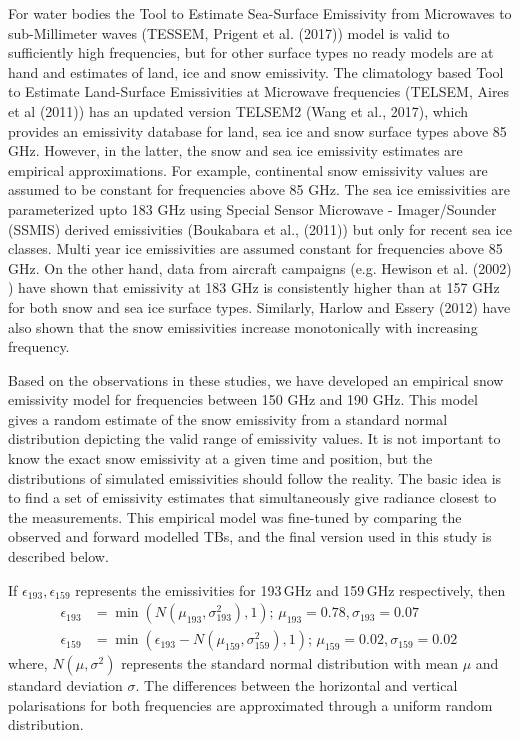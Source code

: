 \documentclass[amt, manuscript]{copernicus}
\begin{document}
For water bodies the Tool to Estimate Sea-Surface Emissivity from Microwaves to sub-Millimeter waves (TESSEM, Prigent et al. (2017)) model is valid to sufficiently high frequencies, but for other surface types no ready models are at hand and estimates of land, ice and snow emissivity. The climatology based Tool to Estimate Land-Surface Emissivities at Microwave frequencies (TELSEM, Aires et al (2011)) has an updated version TELSEM2 (Wang et al., 2017), which provides an emissivity database for land, sea ice and snow surface types above 85 GHz. However, in the latter,  the snow and sea ice emissivity estimates are empirical approximations. For example, continental snow emissivity values are assumed to be constant for frequencies above 85 GHz. The sea ice emissivities are parameterized upto 183 GHz using Special Sensor Microwave - Imager/Sounder (SSMIS) derived emissivities (Boukabara et al., (2011)) but only for recent sea ice classes. Multi year ice emissivities are assumed constant for frequencies above 85 GHz. On the other hand, data from aircraft campaigns (e.g. Hewison et al. (2002) ) have shown that emissivity at 183 GHz is consistently higher than at 157 GHz for both snow and sea ice surface types. Similarly, Harlow and Essery (2012) have also shown that the snow emissivities increase monotonically with increasing frequency. 

Based on the observations in these studies, we have developed an empirical snow emissivity model for frequencies between 150 GHz and 190 GHz. This model gives a random estimate of the snow emissivity from a standard normal distribution depicting the valid range of emissivity values. It is not important to know the exact snow emissivity at a given time and position, but the distributions of simulated emissivities should follow the reality. The basic idea is to find a set of emissivity estimates that simultaneously give radiance closest to the measurements. 
This empirical model was fine-tuned by comparing the observed and forward modelled TBs, and the final version used in this study is described below. 

If $\epsilon_{193}, \epsilon_{159}$ represents the emissivities for 193\,GHz and
159\,GHz respectively, then
\begin{align}
\epsilon_{193}& = \min({N(\mu_{193}, \sigma_{193}^{2}), 1});\, \mu_{193} = 0.78, \sigma_{193} = 0.07 \label{eq:1}\\
\epsilon_{159}& = \min(\epsilon_{193} - N(\mu_{159}, \sigma_{159}^{2}), 1) ;\,  \mu_{159} = 0.02, \sigma_{159} = 0.02\,\label{eq:2}
\end{align}
where, $N(\mu, \sigma^{2})$ represents the standard normal distribution with
mean $\mu$ and standard deviation $\sigma$. The differences between the
horizontal and vertical polarisations for both frequencies are 
approximated through a uniform random distribution.
\end{document}
